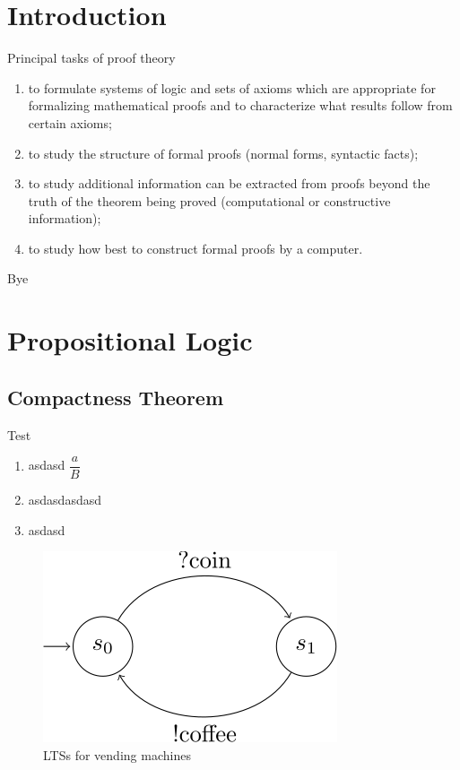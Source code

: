 \documentclass[xcolor=dvipsnames, aspectratio=169, 10pt]{beamer}
\begin{document}
\TitlePage
\SectionPage
\SubsectionPage
\ProgressBar
\PageNumbering
\section{Introduction}
\begin{frame}
	Principal tasks of proof theory \cite{buss1998handbook}
	\begin{enumerate}
		\item to formulate systems of logic and sets of axioms which are appropriate for formalizing mathematical proofs and to characterize what results follow from certain axioms;
		\item to study the structure of formal proofs (normal forms, syntactic facts);
		\item to study additional information can be extracted from proofs beyond the truth of the theorem being proved (computational or constructive information);
		\item to study how best to construct formal proofs by a computer.
	\end{enumerate}
\end{frame}

\begin{frame}
	Bye
\end{frame}
\section{Propositional Logic}
\subsection{Compactness Theorem}
\begin{frame}
  Test
  \cite{buss1998handbook}
  \begin{enumerate}
    \item asdasd $\dfrac{a}{B}$
    \item asdasdasdasd
    \item asdasd
  \end{enumerate}
  \begin{figure}
    \centering
    \includegraphics{images/tikz_1.svg}
    \caption{LTSs for vending machines}
    \label{fig:lts-vending-machines}
  \end{figure}
\end{frame}
\begin{frame}
  \printbibliography
\end{frame}
\end{document}
